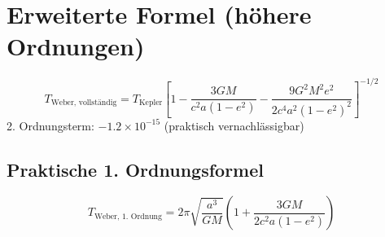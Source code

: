 \section{Erweiterte Formel (höhere Ordnungen)}
\[
T_{\text{Weber, vollständig}} = T_{\text{Kepler}} \left[1 - \frac{3GM}{c^2a(1-e^2)} - \frac{9G^2M^2 e^2}{2c^4a^2(1-e^2)^2}\right]^{-1/2}
\]
2. Ordnungsterm: $-1.2 \times 10^{-15}$ (praktisch vernachlässigbar)

\subsection{Praktische 1. Ordnungsformel}
\[
\boxed{
T_{\text{Weber, 1. Ordnung}} = 2\pi \sqrt{\frac{a^3}{GM}} \left(1 + \frac{3GM}{2c^2a(1-e^2)}\right)
}
\]